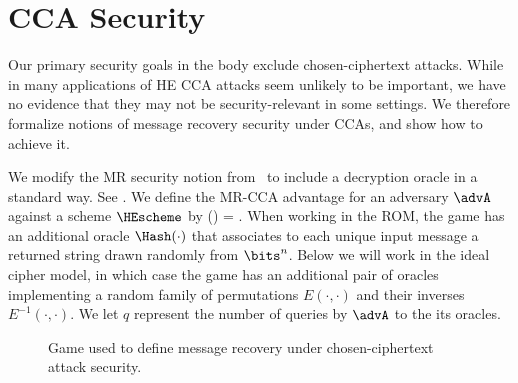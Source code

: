 \section{CCA Security}
\label{sec:cca}

Our primary security goals in the body exclude chosen-ciphertext attacks.
While in many applications of HE CCA attacks seem unlikely to be important, 
we have no evidence that they may not be security-relevant in some settings. 
We therefore formalize notions of message recovery security under CCAs, 
and show how to achieve it. 


We modify the MR security notion from~\cite{JR14}
to include a decryption oracle in a standard way. See .
We define the MR-CCA advantage for an adversary $\advA$ against a scheme $\HEscheme$ by 
\bnm
\AdvMRCCA{\HEscheme,\mdist,\kdist}(\advA) = \Prob{\MRCCA_{\HEscheme,\mdist,\kdist}^\advA\Rightarrow \true} \;.
\enm
When working in the ROM, the game has an additional oracle $\Hash(\cdot)$ that associates to each
unique input message a returned string drawn randomly from $\bits^n$.  
Below we will work in the ideal cipher model, in which case the game has an additional 
pair of oracles implementing a random family of permutations $E(\cdot,\cdot)$ and their
inverses $E^{-1}(\cdot,\cdot)$. 
We let $q$ represent the number of queries by $\advA$ to the its oracles.

\begin{figure}[t]
\center
{}
\caption{Game used to define message recovery under chosen-ciphertext attack security.}
\label{fig:mrcca-def}
\end{figure}


